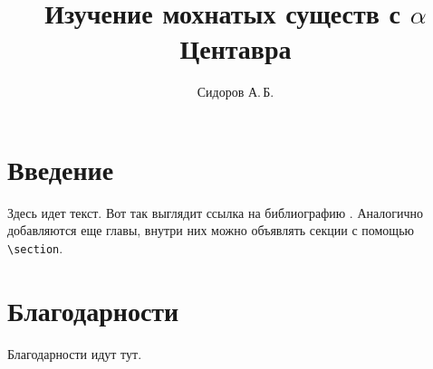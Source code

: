 \documentclass{mipt-thesis-bs}
\title{Изучение мохнатых существ с $\alpha$ Центавра}
\author{Сидоров А.\,Б.}
\begin{document}
\frontmatter
\titlecontents

\mainmatter


\chapter{Введение}

Здесь идет текст. Вот так выглядит ссылка на библиографию \cite{Meneses2012}. Аналогично добавляются еще главы, внутри них можно объявлять секции с помощью \verb|\section|.


\backmatter

\printbib

\chapter{Благодарности}

Благодарности идут тут.
\end{document}
